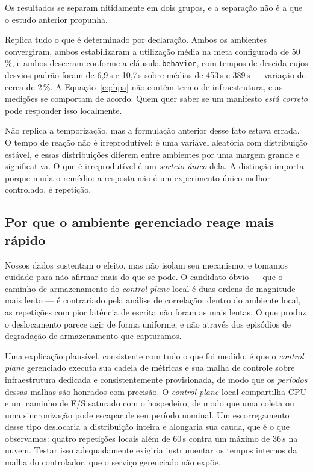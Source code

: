 \documentclass[conference]{IEEEtran}
\begin{document}
Os resultados se separam nitidamente em dois grupos, e a separação não é a que o
estudo anterior propunha.

Replica tudo o que é determinado por declaração. Ambos os ambientes convergiram,
ambos estabilizaram a utilização média na meta configurada de 50\,\%, e ambos
desceram conforme a cláusula \texttt{behavior}, com tempos de descida cujos
desvios-padrão foram de 6,9\,s e 10,7\,s sobre médias de 453\,s e 389\,s ---
variação de cerca de 2\,\%. A Equação~\eqref{eq:hpa} não contém termo de
infraestrutura, e as medições se comportam de acordo. Quem quer saber se um
manifesto \emph{está correto} pode responder isso localmente.

Não replica a temporização, mas a formulação anterior desse fato estava errada. O
tempo de reação não é irreprodutível: é uma variável aleatória com distribuição
estável, e essas distribuições diferem entre ambientes por uma margem grande e
significativa. O que é irreprodutível é um \emph{sorteio único} dela. A distinção
importa porque muda o remédio: a resposta não é um experimento único melhor
controlado, é repetição.

\subsection{Por que o ambiente gerenciado reage mais rápido}

Nossos dados sustentam o efeito, mas não isolam seu mecanismo, e tomamos cuidado
para não afirmar mais do que se pode. O candidato óbvio --- que o caminho de
armazenamento do \emph{control plane} local é duas ordens de magnitude mais
lento --- é contrariado pela análise de correlação: dentro do ambiente local, as
repetições com pior latência de escrita não foram as mais lentas. O que produz o
deslocamento parece agir de forma uniforme, e não através dos episódios de
degradação de armazenamento que capturamos.

Uma explicação plausível, consistente com tudo o que foi medido, é que o
\emph{control plane} gerenciado executa sua cadeia de métricas e sua malha de
controle sobre infraestrutura dedicada e consistentemente provisionada, de modo
que os \emph{períodos} dessas malhas são honrados com precisão. O \emph{control
plane} local compartilha CPU e um caminho de E/S saturado com o hospedeiro, de
modo que uma coleta ou uma sincronização pode escapar de seu período nominal. Um
escorregamento desse tipo deslocaria a distribuição inteira e alongaria sua
cauda, que é o que observamos: quatro repetições locais além de 60\,s contra um
máximo de 36\,s na nuvem. Testar isso adequadamente exigiria instrumentar os
tempos internos da malha do controlador, que o serviço gerenciado não expõe.
\end{document}
